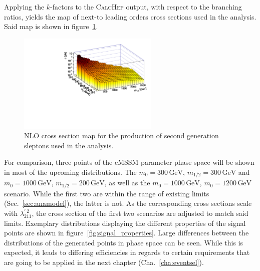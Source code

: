\noindent Applying the $k$-factors to the \textsc{CalcHep} output, with respect to the branching ratios, yields the map of next-to leading orders cross sections used in the analysis. Said map is shown in figure~\ref{fig:susy-2dxs}.

\begin{figure}[!htb]
  \centering
  \includegraphics[width=0.6\textwidth]{plots/2dxs.pdf}
  \caption{NLO cross section map for the production of second generation sleptons used in the analysis.}
  \label{fig:susy-2dxs}
\end{figure}

For comparison, three points of the cMSSM parameter phase space will be shown in most of the upcoming distributions. The $m_0 = 300\,\text{GeV}$, $m_{1/2} = 300\,\text{GeV}$ and $m_0 = 1000\,\text{GeV}$, $m_{1/2} = 200\,\text{GeV}$, as well as the $m_0 = 1000\,\text{GeV}$, $m_0 = 1200\,\text{GeV}$ scenario. While the first two are within the range of existing limits (Sec.~\ref{sec:anamodel}), the latter is not. As the corresponding cross sections scale with $\lambda^{\prime\:2}_{211}$, the cross section of the first two scenarios are adjusted to match said limits. Exemplary distributions displaying the different properties of the signal points are shown in figure~\ref{fig:signal_properties}. Large differences between the distributions of the generated points in phase space can be seen. While this is expected, it leads to differing efficiencies in regards to certain requirements that are going to be applied in the next chapter (Cha.~\ref{cha:eventsel}).

